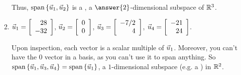 \documentclass{ximera}
\begin{document}
\begin{example}
\begin{enumerate}
\begin{solution}
      Thus, $\sspan\set{\vect{u}_1,\vect{u}_2}$ is a , a $\answer{2}$-dimensional subspace of $\R^3$.

    \end{solution}

    \item $\vect{u}_1=\startmat{r} 28 \\ -32 \stopmat$, $\vect{u}_2=\startmat{r} 0 \\ 0 \stopmat$, $\vect{u}_3=\startmat{r} -7/2 \\ 4 \stopmat$, $\vect{u}_4=\startmat{r} -21 \\ 24 \stopmat$.
    
    \begin{solution}
    
      Upon inspection, each vector is a scalar multiple of $\vect{u}_1$. Moreover, you can't have the $0$ vector in a basis, as you can't use it to span anything. So $\sspan\set{\vect{u}_1, \vect{u}_3, \vect{u}_4}=\sspan\set{\vect{u}_1}$, a $1$-dimensional subspace (e.g. a ) in $\R^2$.

    \end{solution}
    
  \end{enumerate}

\end{example}
\end{document}
